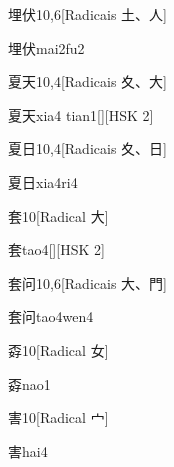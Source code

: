 \begin{entry}{埋伏}{10,6}[Radicais ⼟、⼈]
  \begin{phonetics}{埋伏}{mai2fu2}
  \end{phonetics}
\end{entry}

\begin{entry}{夏天}{10,4}[Radicais ⼢、⼤]
  \begin{phonetics}{夏天}{xia4 tian1}[][HSK 2]
  \end{phonetics}
\end{entry}

\begin{entry}{夏日}{10,4}[Radicais ⼢、⽇]
  \begin{phonetics}{夏日}{xia4ri4}
  \end{phonetics}
\end{entry}

\begin{entry}{套}{10}[Radical ⼤]
  \begin{phonetics}{套}{tao4}[][HSK 2]
  \end{phonetics}
\end{entry}

\begin{entry}{套问}{10,6}[Radicais ⼤、⾨]
  \begin{phonetics}{套问}{tao4wen4}
  \end{phonetics}
\end{entry}

\begin{entry}{孬}{10}[Radical ⼥]
  \begin{phonetics}{孬}{nao1}
  \end{phonetics}
\end{entry}

\begin{entry}{害}{10}[Radical ⼧]
  \begin{phonetics}{害}{hai4}
  \end{phonetics}
\end{entry}

